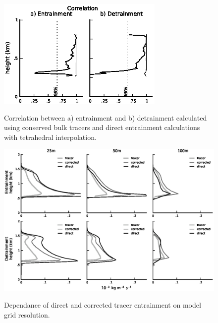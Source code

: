 \documentclass[12pt]{article}
\begin{document}
\begin{figure}[t]
  \noindent\includegraphics[width=19pc,angle=0]{./figures/correlations_core.eps}\\
  \caption{Correlation between a) entrainment and b) detrainment calculated 
using conserved bulk tracers and direct entrainment calculations with 
tetrahedral interpolation.}\label{fig:correlations}
\end{figure}

\begin{figure}[t]
  \noindent\includegraphics[width=40pc,angle=0]{./figures/resolution_dependence_core.eps}\\
  \caption{Dependance of direct and corrected tracer entrainment on model 
grid resolution.}\label{fig:resolution_dependence}
\end{figure}
\end{document}
